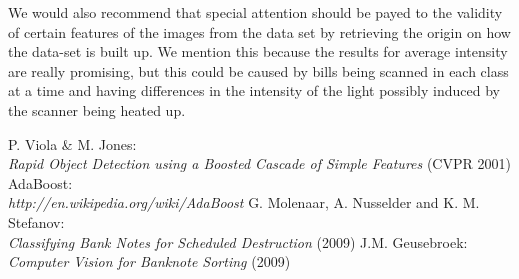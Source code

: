 \documentclass[11pt,twocolumn]{article}
\newcommand{\tit}{\textit}
\begin{document}
		We would also recommend that special attention should be payed to the validity of certain features of the images from the data set by retrieving the origin on how the data-set is built up. We mention this because the results for average intensity are really promising, but this could be caused by bills being scanned in each class at a time and having differences in the intensity of the light possibly induced by the scanner being heated up.
	
		 
		\begin{thebibliography}{3} 
				P. Viola \& M. Jones:\\
				\tit{Rapid Object Detection using a Boosted Cascade of Simple Features}
				(CVPR 2001)
				AdaBoost: \\
				\tit{http://en.wikipedia.org/wiki/AdaBoost}	
			G. Molenaar, A. Nusselder and K. M. Stefanov: \\
				\tit{Classifying Bank Notes for Scheduled Destruction} (2009)
			 J.M. Geusebroek: \\
				\tit{Computer Vision for Banknote Sorting} (2009)		
		\end{thebibliography}		
\end{document}
